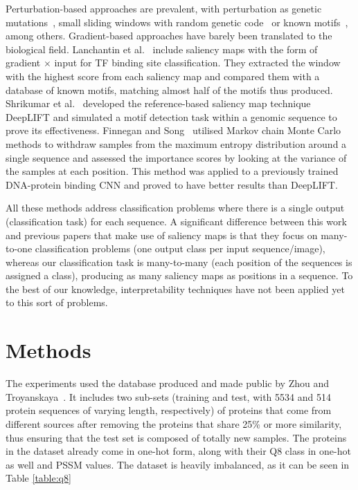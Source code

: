 \documentclass{article}
\begin{document}

Perturbation-based approaches are prevalent, with perturbation as genetic mutations~\cite{Alipanahi2015,Zhou2015}, small sliding windows with random genetic code~\cite{Umarov2017} or known motifs~\cite{Kelley2016}, among others. Gradient-based approaches have barely been translated to the biological field. Lanchantin et al.~\cite{Lanchantin2016} include saliency maps with the form of gradient $\times$ input for TF binding site classification. They extracted the window with the highest score from each saliency map and compared them with a database of known motifs, matching almost half of the motifs thus produced. Shrikumar et al.~\cite{Shrikumar2017} developed the reference-based saliency map technique DeepLIFT and simulated a motif detection task within a genomic sequence to prove its effectiveness. Finnegan and Song~\cite{Finnegan2017} utilised Markov chain Monte Carlo methods to withdraw samples from the maximum entropy distribution around a single sequence and assessed the importance scores by looking at the variance of the samples at each position. This method was applied to a previously trained DNA-protein binding CNN and proved to have better results than DeepLIFT.

All these methods address classification problems where there is a single output (classification task) for each sequence. A significant difference between this work and previous papers that make use of saliency maps is that they focus on many-to-one classification problems (one output class per input sequence/image), whereas our classification task is many-to-many (each position of the sequences is assigned a class), producing as many saliency maps as positions in a sequence. To the best of our knowledge, interpretability techniques have not been applied yet to this sort of problems.

\section{Methods}
\label{sec:methods}

The experiments used the database produced and made public by Zhou and Troyanskaya~\cite{Zhou2014}. It includes two sub-sets (training and test, with 5534 and 514 protein sequences of varying length, respectively) of proteins that come from different sources after removing the proteins that share 25\% or more similarity, thus ensuring that the test set is composed of totally new samples. The proteins in the dataset already come in one-hot form, along with their Q8 class in one-hot as well and PSSM values. The dataset is heavily imbalanced, as it can be seen in Table \ref{table:q8}
\end{document}
